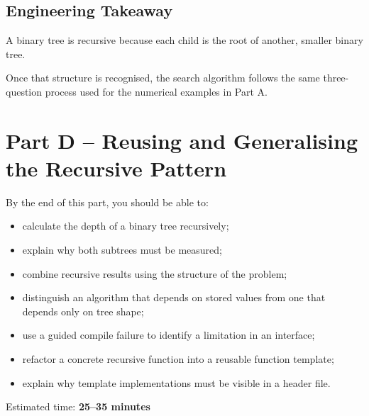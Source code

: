 \documentclass{csc2059practical}
\begin{document}
\subsection{Engineering Takeaway}

\begin{importantnote}
A binary tree is recursive because each child is the root of another, smaller
binary tree.

Once that structure is recognised, the search algorithm follows the same
three-question process used for the numerical examples in Part A.
\end{importantnote}



\section{Part D -- Reusing and Generalising the Recursive Pattern}

\begin{learningoutcomes}
By the end of this part, you should be able to:

\begin{itemize}
    \item calculate the depth of a binary tree recursively;
    \item explain why both subtrees must be measured;
    \item combine recursive results using the structure of the problem;
    \item distinguish an algorithm that depends on stored values from one that
          depends only on tree shape;
    \item use a guided compile failure to identify a limitation in an
          interface;
    \item refactor a concrete recursive function into a reusable function
          template;
    \item explain why template implementations must be visible in a header
          file.
\end{itemize}
\end{learningoutcomes}

\begin{infobox}
Estimated time: \textbf{25--35 minutes}
\end{infobox}
\end{document}
